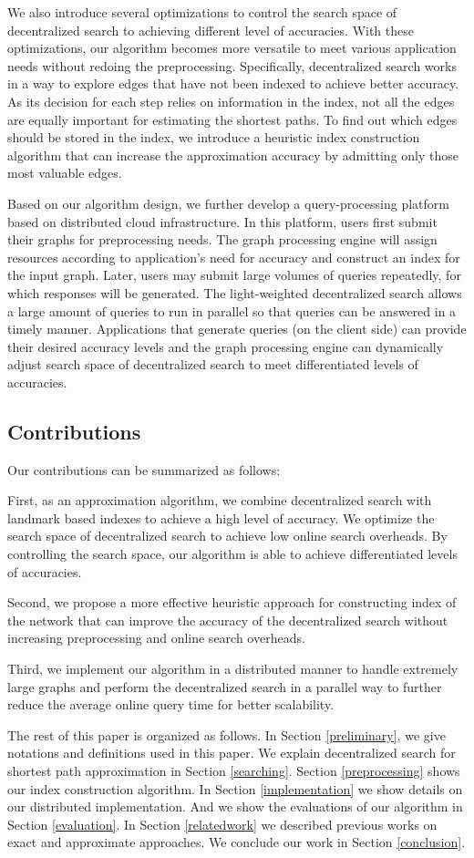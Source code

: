 We also introduce several optimizations to control the search space of decentralized search to achieving different level of accuracies. With these optimizations, our algorithm becomes more versatile to meet various application needs without redoing the preprocessing. Specifically, decentralized search works in a way to explore edges that have not been indexed to achieve better accuracy. As its decision for each step relies on information in the index, not all the edges are equally important for estimating the shortest paths. To find out which edges should be stored in the index, we introduce a heuristic index construction algorithm that can increase the approximation accuracy by admitting only those most valuable edges. 

Based on our algorithm design, we further develop a query-processing platform based on distributed cloud infrastructure. In this platform, users first submit their graphs for preprocessing needs. The graph processing engine will assign resources according to application's need for accuracy and construct an index for the input graph. Later, users may submit large volumes of queries repeatedly, for which responses will be generated. The light-weighted decentralized search allows a large amount of queries to run in parallel so that queries can be answered in a timely manner. Applications that generate queries (on the client side) can provide their desired accuracy levels and the graph processing engine can dynamically adjust search space of decentralized search to meet differentiated levels of accuracies.

\subsection{Contributions}
Our contributions can be summarized as follows:

First, as an approximation algorithm, we combine decentralized search with landmark based indexes to achieve a high level of accuracy. We optimize the search space of decentralized search to achieve low online search overheads. By controlling the search space, our algorithm is able to achieve differentiated levels of accuracies.

Second, we propose a more effective heuristic approach for constructing index of the network that can improve the accuracy of the decentralized search without increasing preprocessing and online search overheads.

Third, we implement our algorithm in a distributed manner to handle extremely large graphs and perform the decentralized search in a parallel way to further reduce the average online query time for better scalability.

The rest of this paper is organized as follows. In Section \ref{preliminary}, we give notations and definitions used in this paper. We explain decentralized search for shortest path approximation in Section \ref{searching}. Section \ref{preprocessing} shows our index construction algorithm. In Section \ref{implementation} we show details on our distributed implementation. And we show the evaluations of our algorithm in Section \ref{evaluation}. In Section \ref{relatedwork} we described previous works on exact and approximate approaches. We conclude our work in Section \ref{conclusion}.
